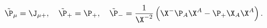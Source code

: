 \begin{equation}
\tilde \P_\mu=\J_{\mu +},\quad
\tilde\P_+=\P_+,\quad
\tilde\P_-=\frac{1}{\X^{-2}}\left(\X^-\P_A\X^A-\P_+\X_A\X^A
\right).
\label{cantr}
\end{equation}

